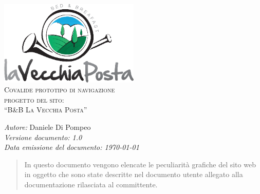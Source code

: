 \documentclass[a4paper,12pt,hidelinks]{report}
\begin{document}
  \begin{titlepage}
    \begin{center}
      \includegraphics[width=0.5\textwidth,keepaspectratio=true]{../img/logo}\\[1cm]    
      \textsc{\LARGE Covalide prototipo di navigazione}\\[0.6cm]
      \textsc{\LARGE  progetto del sito:\\[0.5cm] ``B\&B La Vecchia Posta''}\\ [2.0cm]

      \begin{minipage}{0.8\textwidth}
	\begin{flushleft} \large
	  \emph{Autore:} Daniele Di Pompeo \\[0.5cm]
	  \emph{Versione documento: 1.0}\\[0.5cm]
	  \emph{Data emissione del documento: \today}\\[0.5cm]
	\end{flushleft}
      \end{minipage}
    \end{center}
  \end{titlepage}

 
\begin{abstract}
 In questo documento vengono elencate le peculiarità grafiche del sito web in oggetto che sono state descritte nel documento utente allegato alla documentazione 
 rilasciata al committente.
\end{abstract}
\end{document}
